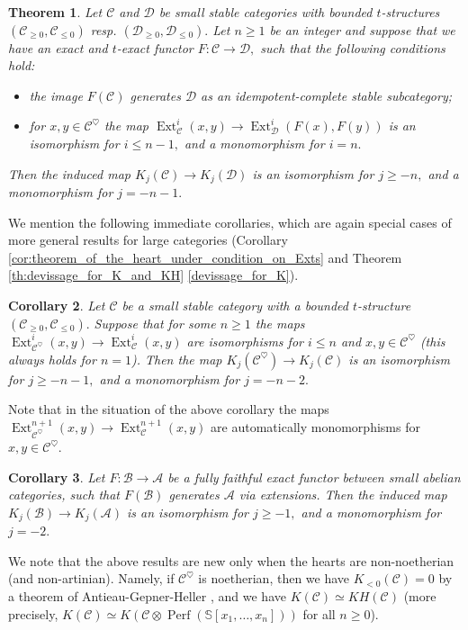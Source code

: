 \documentclass[11pt,leqno]{amsart}
\newtheorem{theo}{Theorem}[section]
\newtheorem{cor}[theo]{Corollary}
\numberwithin{equation}{section}
\def\bS{\mathbb{S}}
\newcommand{\cD}{{\mathcal D}}
\newcommand{\cA}{{\mathcal A}}
\newcommand{\cB}{{\mathcal B}}
\newcommand{\cC}{{\mathcal C}}
\newcommand{\Perf}{\operatorname{Perf}}
\newcommand{\Ext}{\operatorname{Ext}}
\begin{document}
\begin{theo}\label{th:coconnectivity_estimates_intro}
Let $\cC$ and $\cD$ be small stable categories with bounded $t$-structures $(\cC_{\geq 0},\cC_{\leq 0})$ resp. $(\cD_{\geq 0},\cD_{\leq 0}).$ Let $n\geq 1$ be an integer and suppose that we have an exact and $t$-exact functor $F:\cC\to\cD,$ such that the following conditions hold:
\begin{itemize}
	\item the image $F(\cC)$ generates $\cD$ as an idempotent-complete stable subcategory;
	\item for $x,y\in\cC^{\heartsuit}$ the map $\Ext^i_{\cC}(x,y)\to\Ext^i_{\cD}(F(x),F(y))$ is an isomorphism for $i\leq n-1,$ and a monomorphism for $i=n.$
\end{itemize}
Then the induced map $K_j(\cC)\to K_j(\cD)$ is an isomorphism for $j\geq -n,$ and a monomorphism for $j = -n-1.$
\end{theo}

We mention the following immediate corollaries, which are again special cases of more general results for large categories (Corollary \ref{cor:theorem_of_the_heart_under_condition_on_Exts} and Theorem \ref{th:devissage_for_K_and_KH} \ref{devissage_for_K}).

\begin{cor}\label{cor:refined_th_of_the_heart_intro}
Let $\cC$ be a small stable category with a bounded $t$-structure $(\cC_{\geq 0},\cC_{\leq 0}).$ Suppose that for some $n\geq 1$ the maps $\Ext^i_{\cC^{\heartsuit}}(x,y)\to\Ext^i_{\cC}(x,y)$ are isomorphisms for $i\leq n$ and $x,y\in\cC^{\heartsuit}$ (this always holds for $n=1$). Then the map $K_j(\cC^{\heartsuit})\to K_j(\cC)$ is an isomorphism for $j\geq -n-1,$ and a monomorphism for $j=-n-2.$ 
\end{cor}

Note that in the situation of the above corollary the maps $\Ext^{n+1}_{\cC^{\heartsuit}}(x,y)\to \Ext^{n+1}_{\cC}(x,y)$ are automatically monomorphisms for $x,y\in\cC^{\heartsuit}.$

\begin{cor}\label{cor:devissage_for_K_intro}
Let $F:\cB\to\cA$ be a fully faithful exact functor between small abelian categories, such that $F(\cB)$ generates $\cA$ via extensions. Then the induced map $K_j(\cB)\to K_j(\cA)$ is an isomorphism for $j\geq -1,$ and a monomorphism for $j = -2.$
\end{cor}

We note that the above results are new only when the hearts are non-noetherian (and non-artinian). Namely, if $\cC^{\heartsuit}$ is noetherian, then we have $K_{<0}(\cC)=0$ by a theorem of Antieau-Gepner-Heller \cite[Theorem 3.6]{AGH19}, and we have $K(\cC)\simeq KH(\cC)$ (more precisely, $K(\cC)\simeq K(\cC\otimes \Perf(\bS[x_1,\dots,x_n]))$ for all $n\geq 0$). 
\end{document}
